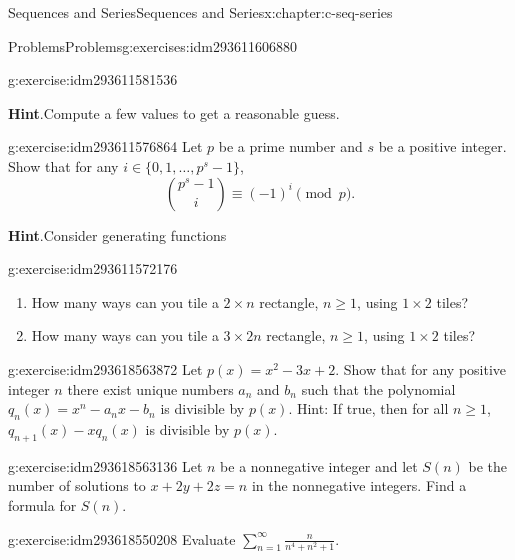 \documentclass[twoside,10pt,]{book}
\newcommand{\blocktitlefont}{\relax}
\numberwithin{equation}{section}
\begin{document}
\begin{chapterptx}{Sequences and Series}{}{Sequences and Series}{}{}{x:chapter:c-seq-series}
\begin{exercises-section}{Problems}{}{Problems}{}{}{g:exercises:idm293611606880}
\begin{divisionexercise}{9}{}{}{g:exercise:idm293611581536}
\par\smallskip%
\noindent\textbf{\blocktitlefont Hint}.\label{g:hint:idm293611580640}{}\hypertarget{g:hint:idm293611580640}{}\quad{}Compute a few values to get a reasonable guess.%
\end{divisionexercise}%
\begin{divisionexercise}{10}{}{}{g:exercise:idm293611576864}%
Let \(p\) be a prime number and \(s\) be a positive integer.  Show that for any \(i \in \{0, 1, \dots,p^s-1\}\),%
\begin{equation*}
\binom{p^s-1}{i} \equiv (-1)^i \pmod{p}.
\end{equation*}
%
\par\smallskip%
\noindent\textbf{\blocktitlefont Hint}.\label{g:hint:idm293611573952}{}\hypertarget{g:hint:idm293611573952}{}\quad{}Consider generating functions%
\end{divisionexercise}%
\begin{divisionexercise}{11}{}{}{g:exercise:idm293611572176}%
%
\begin{enumerate}[label=(\alph*)]
\item{}How many ways can you tile a \(2 \times  n\) rectangle, \(n\geq 1\), using \(1\times 2\) tiles?%
\item{}How many ways can you tile a \(3 \times  2n\) rectangle, \(n\geq 1\), using \(1\times 2\) tiles?%
\end{enumerate}
%
\end{divisionexercise}%
\begin{divisionexercise}{12}{}{}{g:exercise:idm293618563872}%
Let \(p(x)=x^2-3x + 2\).  Show that for any positive integer \(n\) there exist unique numbers \(a_n\) and \(b_n\) such that the polynomial \(q_n(x)=
x^n-a_nx-b_n\) is divisible by \(p(x)\).    Hint:  If true, then for all \(n\geq 1\),   \(q_{n+1}(x)-x q_n(x)\) is divisible by \(p(x)\).%
\end{divisionexercise}%
\begin{divisionexercise}{13}{}{}{g:exercise:idm293618563136}%
Let \(n\) be a nonnegative integer and let \(S(n)\) be the number of solutions to \(x + 2 y + 2 z = n\) in the nonnegative integers.  Find a formula for \(S(n)\).%
\end{divisionexercise}%
\begin{divisionexercise}{14}{}{}{g:exercise:idm293618550208}%
Evaluate \(\sum_{n=1}^{\infty} \frac{n}{n^4+n^2+1}\).%
\end{divisionexercise}%
\end{exercises-section}
\end{chapterptx}
\end{document}
